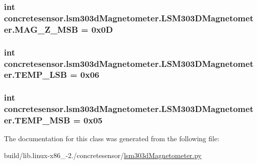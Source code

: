 \subsubsection[{M\+A\+G\+\_\+\+Z\+\_\+\+M\+S\+B}]{\setlength{\rightskip}{0pt plus 5cm}int concretesensor.\+lsm303d\+Magnetometer.\+L\+S\+M303\+D\+Magnetometer.\+M\+A\+G\+\_\+\+Z\+\_\+\+M\+S\+B = 0x0\+D\hspace{0.3cm}{\ttfamily [static]}}\label{classconcretesensor_1_1lsm303dMagnetometer_1_1LSM303DMagnetometer_ae8d92c8ed39206da2c1224c9a4386264}
\hypertarget{classconcretesensor_1_1lsm303dMagnetometer_1_1LSM303DMagnetometer_ac2a5e3eb06625ae97f5b71c9d8c98d7f}{}
\subsubsection[{T\+E\+M\+P\+\_\+\+L\+S\+B}]{\setlength{\rightskip}{0pt plus 5cm}int concretesensor.\+lsm303d\+Magnetometer.\+L\+S\+M303\+D\+Magnetometer.\+T\+E\+M\+P\+\_\+\+L\+S\+B = 0x06\hspace{0.3cm}{\ttfamily [static]}}\label{classconcretesensor_1_1lsm303dMagnetometer_1_1LSM303DMagnetometer_ac2a5e3eb06625ae97f5b71c9d8c98d7f}
\hypertarget{classconcretesensor_1_1lsm303dMagnetometer_1_1LSM303DMagnetometer_a22b827cc18c5f535bdbfc4dc32c5adc9}{}
\subsubsection[{T\+E\+M\+P\+\_\+\+M\+S\+B}]{\setlength{\rightskip}{0pt plus 5cm}int concretesensor.\+lsm303d\+Magnetometer.\+L\+S\+M303\+D\+Magnetometer.\+T\+E\+M\+P\+\_\+\+M\+S\+B = 0x05\hspace{0.3cm}{\ttfamily [static]}}\label{classconcretesensor_1_1lsm303dMagnetometer_1_1LSM303DMagnetometer_a22b827cc18c5f535bdbfc4dc32c5adc9}


The documentation for this class was generated from the following file\+:\begin{DoxyCompactItemize}
\item 
build/lib.\+linux-\/x86\+\_-\/2./concretesensor/\hyperlink{build_2lib_8linux-x86__64-2_87_2concretesensor_2lsm303dMagnetometer_8py}{lsm303d\+Magnetometer.\+py}\end{DoxyCompactItemize}
